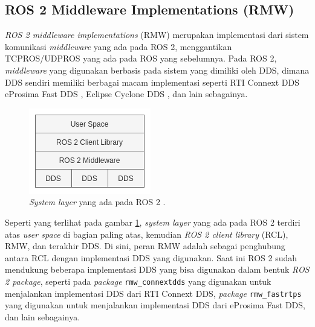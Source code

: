 \subsection{ROS 2 Middleware Implementations (RMW)}
\label{subsec:rmw}

\emph{ROS 2 middleware implementations} (RMW) \citep{url:rmwdesign} merupakan implementasi dari sistem komunikasi \emph{middleware} yang ada pada ROS 2,
  menggantikan TCPROS/UDPROS yang ada pada ROS yang sebelumnya.
Pada ROS 2, \emph{middleware} yang digunakan berbasis pada sistem yang dimiliki oleh DDS,
  dimana DDS sendiri memiliki berbagai macam implementasi seperti RTI Connext DDS \citep{url:rmwdesign} eProsima Fast DDS \citep{url:fastdds},
  Eclipse Cyclone DDS \citep{url:cyclonedds},
  dan lain sebagainya.

\begin{figure}[ht]
  \centering
  \includegraphics[scale=0.55]{gambar/layer-sistem-ros2.png}
  \caption{\emph{System layer} yang ada pada ROS 2 \citep{url:rmwdesign}.}
  \label{fig:layersistemros2}
\end{figure}

Seperti yang terlihat pada gambar \ref{fig:layersistemros2},
  \emph{system layer} yang ada pada ROS 2 terdiri atas \emph{user space} di bagian paling atas,
  kemudian \emph{ROS 2 client library} (RCL), RMW, dan terakhir DDS.
Di sini, peran RMW adalah sebagai penghubung antara RCL dengan implementasi DDS yang digunakan.
Saat ini ROS 2 sudah mendukung beberapa implementasi DDS yang bisa digunakan dalam bentuk \emph{ROS 2 package},
  seperti pada \emph{package} \lstinline{rmw_connextdds} yang digunakan untuk menjalankan implementasi DDS dari RTI Connext DDS,
  \emph{package} \lstinline{rmw_fastrtps} yang digunakan untuk menjalankan implementasi DDS dari eProsima Fast DDS,
  dan lain sebagainya.

